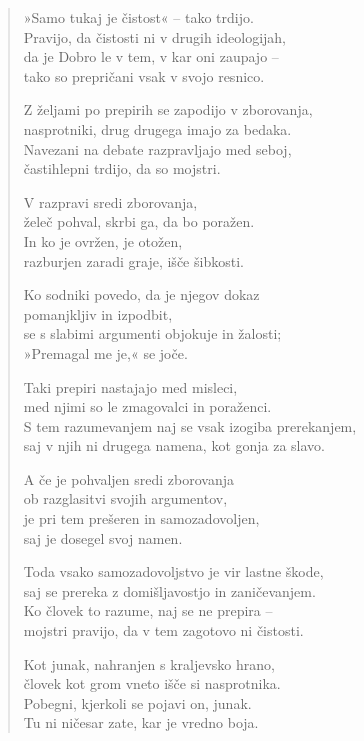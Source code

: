 \begin{verse}


»Samo tukaj je čistost« -- tako trdijo.\\
Pravijo, da čistosti ni v drugih ideologijah,\\
da je Dobro le v tem, v kar oni zaupajo --\\
tako so prepričani vsak v svojo resnico.

Z željami po prepirih se zapodijo v zborovanja,\\
nasprotniki, drug drugega imajo za bedaka.\\
Navezani na debate razpravljajo med seboj,\\
častihlepni trdijo, da so mojstri.

V razpravi sredi zborovanja,\\
želeč pohval, skrbi ga, da bo poražen.\\
In ko je ovržen, je otožen,\\
razburjen zaradi graje, išče šibkosti.

Ko sodniki povedo, da je njegov dokaz\\
pomanjkljiv in izpodbit,\\
se s slabimi argumenti objokuje in žalosti;\\
»Premagal me je,« se joče.

Taki prepiri nastajajo med misleci,\\
med njimi so le zmagovalci in poraženci.\\
S tem razumevanjem naj se vsak izogiba prerekanjem,\\
saj v njih ni drugega namena, kot gonja za slavo.

A če je pohvaljen sredi zborovanja\\
ob razglasitvi svojih argumentov,\\
je pri tem prešeren in samozadovoljen,\\
saj je dosegel svoj namen.

Toda vsako samozadovoljstvo je vir lastne škode,\\
saj se prereka z domišljavostjo in zaničevanjem.\\
Ko človek to razume, naj se ne prepira --\\
mojstri pravijo, da v tem zagotovo ni čistosti.

Kot junak, nahranjen s kraljevsko hrano,\\
človek kot grom vneto išče si nasprotnika.\\
Pobegni, kjerkoli se pojavi on, junak.\\
Tu ni ničesar zate, kar je vredno boja.


\end{verse}
